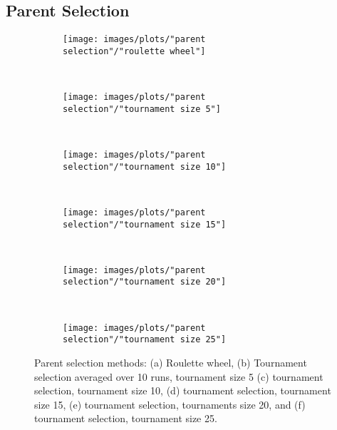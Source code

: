 \subsection{Parent Selection}


\begin{figure}[h!]
    \centering
    \begin{subfigure}[b]{0.31\textwidth}
        \texttt{[image: images/plots/"parent selection"/"roulette wheel"]}
        \caption{}
        \hfill
        \label{plot:roulette wheel}
    \end{subfigure}
    ~
    \begin{subfigure}[b]{0.31\textwidth}
        \texttt{[image: images/plots/"parent selection"/"tournament size 5"]}
        \caption{}
        \hfill
        \label{plot:tournament size 5}
    \end{subfigure}
    ~
       \begin{subfigure}[b]{0.31\textwidth}
        \texttt{[image: images/plots/"parent selection"/"tournament size 10"]}
        \caption{}
        \hfill
        \label{plot:tournament size 10}
    \end{subfigure}
    ~
       \begin{subfigure}[b]{0.31\textwidth}
        \texttt{[image: images/plots/"parent selection"/"tournament size 15"]}
        \caption{}
        \hfill
        \label{plot:tournament size 15}
    \end{subfigure}
    ~
       \begin{subfigure}[b]{0.31\textwidth}
        \texttt{[image: images/plots/"parent selection"/"tournament size 20"]}
        \caption{}
        \hfill
        \label{plot:tournament size 20}
    \end{subfigure}
    ~
    \begin{subfigure}[b]{0.31\textwidth}
        \texttt{[image: images/plots/"parent selection"/"tournament size 25"]}
        \caption{}
        \hfill
        \label{plot:tournament size 25}
    \end{subfigure}
    \caption{Parent selection methods: (a) Roulette wheel, (b) Tournament selection averaged over 10 runs, tournament size 5 (c) tournament selection, tournament size 10, (d) tournament selection, tournament size 15, (e) tournament selection, tournaments size 20, and (f) tournament selection, tournament size 25.}
    \label{plot:parent selection}
\end{figure}


